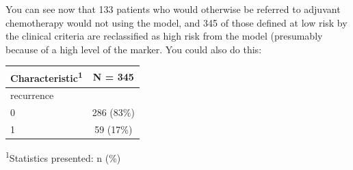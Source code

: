 \documentclass[]{book}
\newenvironment{Shaded}{\begin{snugshade}}{\end{snugshade}}
\newcommand{\DataTypeTok}[1]{\textcolor[rgb]{0.13,0.29,0.53}{#1}}
\newcommand{\DecValTok}[1]{\textcolor[rgb]{0.00,0.00,0.81}{#1}}
\newcommand{\KeywordTok}[1]{\textcolor[rgb]{0.13,0.29,0.53}{\textbf{#1}}}
\newcommand{\NormalTok}[1]{#1}
\newcommand{\OperatorTok}[1]{\textcolor[rgb]{0.81,0.36,0.00}{\textbf{#1}}}
\newcommand{\StringTok}[1]{\textcolor[rgb]{0.31,0.60,0.02}{#1}}
\begin{document}
You can see now that 133 patients who would otherwise be referred to adjuvant chemotherapy would not using the model, and 345 of those defined at low risk by the clinical criteria are reclassified as high risk from the model (presumably because of a high level of the marker. You could also do this:

\begin{Shaded}
\end{Shaded}

\captionsetup[table]{labelformat=empty,skip=1pt}
\begin{longtable}{lc}
\toprule
\textbf{Characteristic}\textsuperscript{1} & \textbf{N = 345} \\ 
\midrule
recurrence &  \\ 
0 & 286 (83\%) \\ 
1 & 59 (17\%) \\ 
\bottomrule
\end{longtable}
\vspace{-5mm}
\begin{minipage}{\linewidth}
\textsuperscript{1}Statistics presented: n (\%) \\ 
\end{minipage}

\begin{Shaded}
\end{Shaded}
\end{document}
